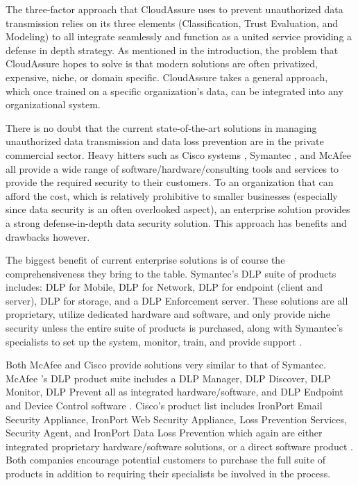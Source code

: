 The three-factor approach that CloudAssure uses to prevent unauthorized data
transmission relies on its three elements (Classification, Trust Evaluation, and
Modeling) to all integrate seamlessly and function as a united service providing
a defense in depth strategy. As mentioned in the introduction, the problem that
CloudAssure hopes to solve is that modern solutions are often privatized,
expensive, niche, or domain specific. CloudAssure takes a general approach,
which once trained on a specific organization’s data, can be integrated into any
organizational system.  

There is no doubt that the current state-of-the-art
solutions in managing unauthorized data transmission and data loss prevention
are in the private commercial sector. Heavy hitters such as Cisco systems \autocite{Cisco2008},
Symantec \autocite{Symantec2013}, and McAfee \autocite{McAfee2013} all provide a wide range of
software/hardware/consulting tools and services to provide the required security
to their customers. To an organization that can afford the cost, which is
relatively prohibitive to smaller businesses (especially since data security is
an often overlooked aspect), an enterprise solution provides a strong
defense-in-depth data security solution. This approach has benefits and
drawbacks however.  

The biggest benefit of current enterprise solutions is of
course the comprehensiveness they bring to the table. Symantec’s DLP suite of
products includes: DLP for Mobile, DLP for Network, DLP for endpoint (client and
server), DLP for storage, and a DLP Enforcement server. These solutions are all
proprietary, utilize dedicated hardware and software, and only provide niche
security unless the entire suite of products is purchased, along with Symantec’s
specialists to set up the system, monitor, train, and provide support \autocite{Symantec2013}.

Both McAfee and Cisco provide solutions very similar to that of Symantec. McAfee
’s DLP product suite includes a DLP Manager, DLP Discover, DLP Monitor, DLP
Prevent all as integrated hardware/software, and DLP Endpoint and Device Control
software \autocite{McAfee2013}. Cisco’s product list includes IronPort Email Security Appliance,
IronPort Web Security Appliance, Loss Prevention Services, Security Agent, and
IronPort Data Loss Prevention which again are either integrated proprietary
hardware/software solutions, or a direct software product \autocite{Cisco2008}. Both companies
encourage potential customers to purchase the full suite of products in addition
to requiring their specialists be involved in the process.  

